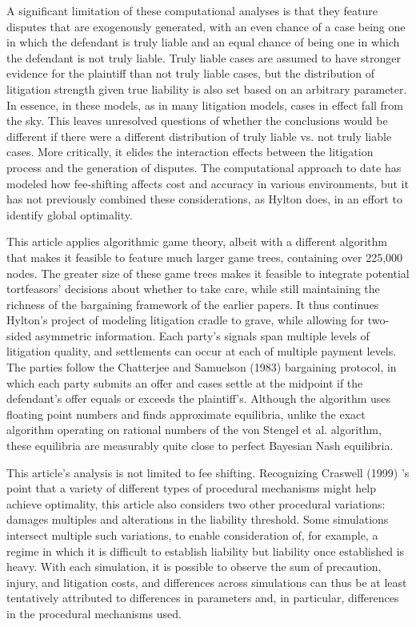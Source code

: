 \documentclass{article}
\begin{document}
A significant limitation of these computational analyses is that they feature disputes that are exogenously generated, with an even chance of a case being one in which the defendant is truly liable and an equal chance of being one in which the defendant is not truly liable. Truly liable cases are assumed to have stronger evidence for the plaintiff than not truly liable cases, but the distribution of litigation strength given true liability is also set based on an arbitrary parameter. In essence, in these models, as in many litigation models, cases in effect fall from the sky. This leaves unresolved questions of whether the conclusions would be different if there were a different distribution of truly liable vs. not truly liable cases. More critically, it elides the interaction effects between the litigation process and the generation of disputes. The computational approach to date has modeled how fee-shifting affects cost and accuracy in various environments, but it has not previously combined these considerations, as Hylton does, in an effort to identify global optimality.

This article applies algorithmic game theory, albeit with a different algorithm that makes it feasible to feature much larger game trees, containing over 225,000 nodes. The greater size of these game trees makes it feasible to integrate potential tortfeasors' decisions about whether to take care, while still maintaining the richness of the bargaining framework of the earlier papers. It thus continues Hylton's project of modeling litigation cradle to grave, while allowing for two-sided asymmetric information. Each party's signals span multiple levels of litigation quality, and settlements can occur at each of multiple payment levels. The parties follow the Chatterjee and Samuelson (1983) \cite{chatterjeesamuelson} bargaining protocol, in which each party submits an offer and cases settle at the midpoint if the defendant's offer equals or exceeds the plaintiff's. Although the algorithm uses floating point numbers and finds approximate equilibria, unlike the exact algorithm operating on rational numbers of the von Stengel et al. algorithm, these equilibria are measurably quite close to perfect Bayesian Nash equilibria. 

This article's analysis is not limited to fee shifting. Recognizing Craswell (1999) \cite{craswell}'s point that a variety of different types of procedural mechanisms might help achieve optimality, this article also considers two other procedural variations: damages multiples and alterations in the liability threshold. Some simulations intersect multiple such variations, to enable consideration of, for example, a regime in which it is difficult to establish liability but liability once established is heavy. With each simulation, it is possible to observe the sum of precaution, injury, and litigation costs, and differences across simulations can thus be at least tentatively attributed to differences in parameters and, in particular, differences in the procedural mechanisms used. 
\end{document}
